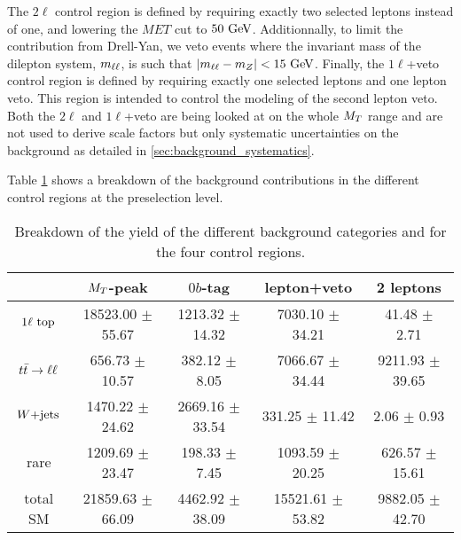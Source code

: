         The $2\ell$ control region is defined by requiring exactly two selected leptons instead of
        one, and lowering the $MET$ cut to $50 ~\text{GeV}$. Additionnally, to limit the contribution
        from Drell-Yan, we veto events where the invariant mass of the dilepton system, $m_{\ell\ell}$,
        is such that $\left|m_{\ell\ell} - m_{Z}\right| < 15 ~\text{GeV}$. Finally, the $1\ell$+veto control 
        region is defined by requiring exactly one selected leptons and one lepton veto. This region 
        is intended to control the modeling of the second lepton veto. Both the $2\ell$ and $1\ell$+veto
        are being looked at on the whole $M_T$ range and are not used to derive scale factors but only 
        systematic uncertainties on the background as detailed in \ref{sec:background_systematics}.

        Table \ref{tab:cutflowControlRegions} shows a breakdown of the background contributions in the 
        different control regions at the preselection level.

        \begin{table}[h!]
        \begin{tabular}{|c|cccc|}
            \hline
                             & $M_T$-peak             & $0b$-tag               & lepton+veto            & 2 leptons             \\ 
            \hline
             $1\ell~\text{top}$ & 18523.00 $\pm$ 55.67   &  1213.32 $\pm$ 14.32   &  7030.10 $\pm$ 34.21   &   41.48 $\pm$ 2.71    \\  
             $t\bar{t} \rightarrow \ell \ell$  &   656.73 $\pm$ 10.57   &   382.12 $\pm$ 8.05    &  7066.67 $\pm$ 34.44   & 9211.93 $\pm$ 39.65   \\
             $\text{$W$+jets}$        &  1470.22 $\pm$ 24.62   &  2669.16 $\pm$ 33.54   &   331.25 $\pm$ 11.42   &    2.06 $\pm$ 0.93    \\ 
             rare            &  1209.69 $\pm$ 23.47   &   198.33 $\pm$ 7.45    &  1093.59 $\pm$ 20.25   &  626.57 $\pm$ 15.61   \\
            \hline
             total SM        & 21859.63 $\pm$ 66.09   &  4462.92 $\pm$ 38.09   & 15521.61 $\pm$ 53.82   & 9882.05 $\pm$ 42.70   \\ 
            \hline
        \end{tabular}
            \caption{Breakdown of the yield of the different background categories and for the four control regions.}
            \label{tab:cutflowControlRegions}
        \end{table}


